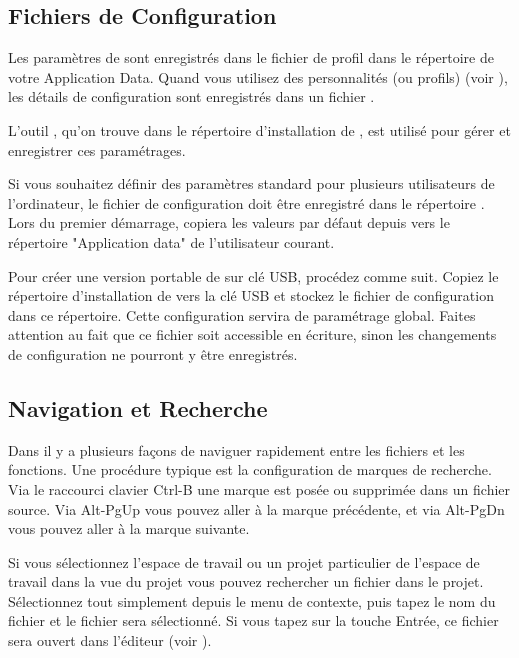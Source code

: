 
\subsection{Fichiers de Configuration}

Les paramètres de \codeblocks sont enregistrés dans le fichier de profil  dans le répertoire  de votre Application Data. Quand vous utilisez des personnalités (ou profils) (voir ), les détails de configuration sont enregistrés dans un fichier .

L'outil , qu'on trouve dans le répertoire d'installation de \codeblocks, est utilisé pour gérer et enregistrer ces paramétrages.

Si vous souhaitez définir des paramètres standard pour plusieurs utilisateurs de l'ordinateur, le fichier de configuration  doit être enregistré dans le répertoire . Lors du premier démarrage, \codeblocks copiera les valeurs par défaut depuis   vers le répertoire "Application data" de l'utilisateur courant.

Pour créer une version portable de \codeblocks sur clé USB, procédez comme suit. Copiez le répertoire d'installation de \codeblocks vers la clé USB et stockez le fichier de configuration  dans ce répertoire. Cette configuration servira de paramétrage global. Faites attention au fait que ce fichier soit accessible en écriture, sinon les changements de configuration ne pourront y être enregistrés.

\subsection{Navigation et Recherche}

Dans \codeblocks il y a plusieurs façons de naviguer rapidement entre les fichiers et les fonctions. Une procédure typique est la configuration de marques de recherche. Via le raccourci clavier Ctrl-B une marque est posée ou supprimée dans un fichier source. Via Alt-PgUp vous pouvez aller à la marque précédente, et via Alt-PgDn vous pouvez aller à la marque suivante.

Si vous sélectionnez l'espace de travail ou un projet particulier de l'espace de travail dans la vue du projet vous pouvez rechercher un fichier dans le projet. Sélectionnez tout simplement  depuis le menu de contexte, puis tapez le nom du fichier et le fichier sera sélectionné. Si vous tapez sur la touche Entrée, ce fichier sera ouvert dans l'éditeur (voir ).


